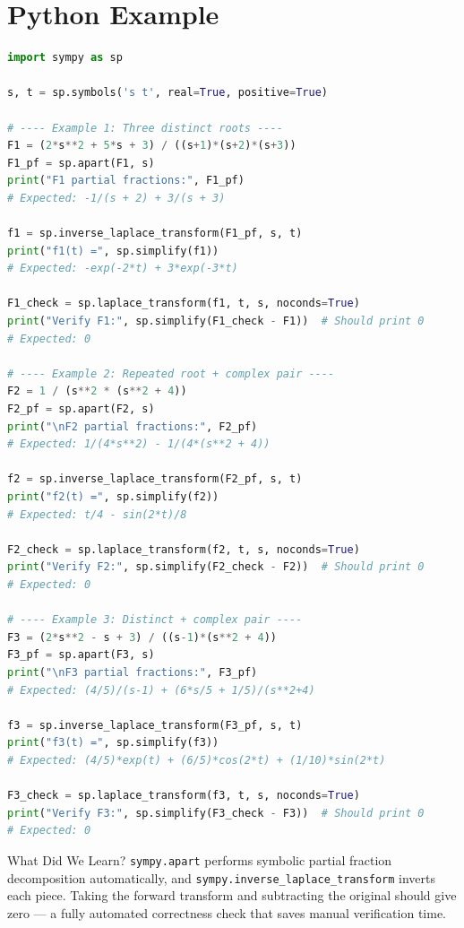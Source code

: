 \documentclass[12pt,a4paper]{article}
\begin{document}
\section{Python Example }
\begin{lstlisting}[language=Python, caption={Partial fraction decomposition and inverse Laplace via sympy}]
import sympy as sp

s, t = sp.symbols('s t', real=True, positive=True)

# ---- Example 1: Three distinct roots ----
F1 = (2*s**2 + 5*s + 3) / ((s+1)*(s+2)*(s+3))
F1_pf = sp.apart(F1, s)
print("F1 partial fractions:", F1_pf)
# Expected: -1/(s + 2) + 3/(s + 3)

f1 = sp.inverse_laplace_transform(F1_pf, s, t)
print("f1(t) =", sp.simplify(f1))
# Expected: -exp(-2*t) + 3*exp(-3*t)

F1_check = sp.laplace_transform(f1, t, s, noconds=True)
print("Verify F1:", sp.simplify(F1_check - F1))  # Should print 0
# Expected: 0

# ---- Example 2: Repeated root + complex pair ----
F2 = 1 / (s**2 * (s**2 + 4))
F2_pf = sp.apart(F2, s)
print("\nF2 partial fractions:", F2_pf)
# Expected: 1/(4*s**2) - 1/(4*(s**2 + 4))

f2 = sp.inverse_laplace_transform(F2_pf, s, t)
print("f2(t) =", sp.simplify(f2))
# Expected: t/4 - sin(2*t)/8

F2_check = sp.laplace_transform(f2, t, s, noconds=True)
print("Verify F2:", sp.simplify(F2_check - F2))  # Should print 0
# Expected: 0

# ---- Example 3: Distinct + complex pair ----
F3 = (2*s**2 - s + 3) / ((s-1)*(s**2 + 4))
F3_pf = sp.apart(F3, s)
print("\nF3 partial fractions:", F3_pf)
# Expected: (4/5)/(s-1) + (6*s/5 + 1/5)/(s**2+4)

f3 = sp.inverse_laplace_transform(F3_pf, s, t)
print("f3(t) =", sp.simplify(f3))
# Expected: (4/5)*exp(t) + (6/5)*cos(2*t) + (1/10)*sin(2*t)

F3_check = sp.laplace_transform(f3, t, s, noconds=True)
print("Verify F3:", sp.simplify(F3_check - F3))  # Should print 0
# Expected: 0
\end{lstlisting}

\begin{learnbox}{What Did We Learn?}
\texttt{sympy.apart} performs symbolic partial fraction decomposition
automatically, and \texttt{sympy.inverse\_laplace\_transform} inverts each
piece. Taking the forward transform and subtracting the original should give
zero --- a fully automated correctness check that saves manual verification
time.
\end{learnbox}
\end{document}
